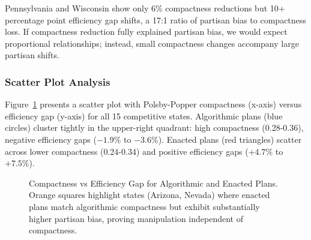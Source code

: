 Pennsylvania and Wisconsin show only 6\% compactness reductions but 10+ percentage point efficiency gap shifts, a 17:1 ratio of partisan bias to compactness loss. If compactness reduction fully explained partisan bias, we would expect proportional relationships; instead, small compactness changes accompany large partisan shifts.

\subsubsection{Scatter Plot Analysis}

Figure~\ref{fig:compactness-eg-scatter} presents a scatter plot with Polsby-Popper compactness (x-axis) versus efficiency gap (y-axis) for all 15 competitive states. Algorithmic plans (blue circles) cluster tightly in the upper-right quadrant: high compactness (0.28-0.36), negative efficiency gaps ($-1.9\%$ to $-3.6\%$). Enacted plans (red triangles) scatter across lower compactness (0.24-0.34) and positive efficiency gaps ($+4.7\%$ to $+7.5\%$).

\begin{figure}[h]
\centering
{}
\caption{Compactness vs Efficiency Gap for Algorithmic and Enacted Plans. Orange squares highlight states (Arizona, Nevada) where enacted plans match algorithmic compactness but exhibit substantially higher partisan bias, proving manipulation independent of compactness.}
\label{fig:compactness-eg-scatter}
\end{figure}

